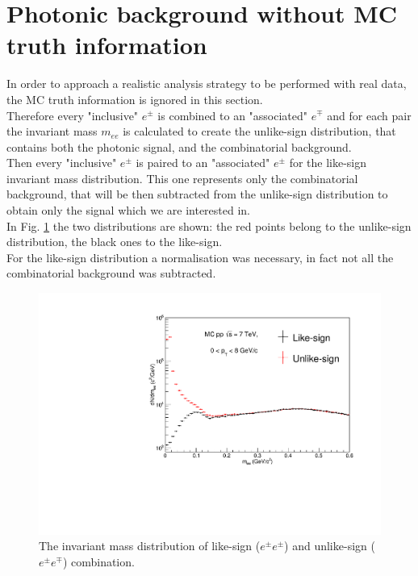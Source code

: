 \documentclass[a4paper,twocolumn,gsifonts,twoside]{gsipaper}
\begin{document}
\newpage
\section{Photonic background without MC truth information}
In order to approach a realistic analysis strategy to be performed with real data, the MC truth information is ignored in this section.\\
Therefore every "inclusive" $e^{\pm}$ is combined to an "associated" $e^{\mp}$ and for each pair the invariant mass $m_{ee}$ is 
calculated to create the unlike-sign distribution, that contains both the photonic signal, and the combinatorial background. \\
Then every "inclusive" $e^{\pm}$ is paired to an "associated" $e^{\pm}$ for the like-sign invariant mass distribution. 
This one represents only the combinatorial background, that will be then subtracted from the unlike-sign distribution to obtain only 
the signal which we are interested in.\\In Fig. \ref{LSUS} the two distributions are shown: the red points belong to the 
unlike-sign distribution, the black ones to the like-sign.\\
For the like-sign distribution a normalisation was necessary, in fact not all the combinatorial background was subtracted.

\begin{figure}[htb]
\center
\includegraphics[scale = 0.4]{like-unlike_norm.pdf}
\caption{The invariant mass distribution of like-sign ($e^{\pm}e^{\pm}$) and unlike-sign ($e^{\pm}e^{\mp}$) combination.}
\label{LSUS}
\end{figure}
\end{document}
